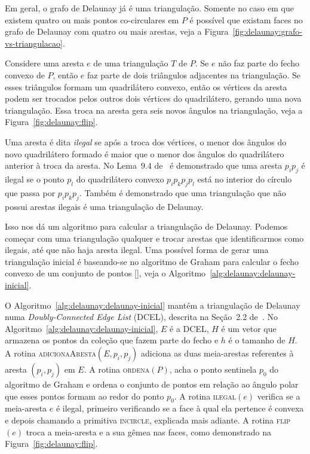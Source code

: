 

Em geral, o grafo de Delaunay já é uma triangulação.
Somente no caso em que existem quatro ou mais pontos co-circulares em $P$ é possível que existam
faces no grafo de Delaunay com quatro ou mais arestas, veja a
Figura~\ref{fig:delaunay:grafo-vs-triangulacao}.



Considere uma aresta $e$ de uma triangulação $T$ de $P$.
Se $e$ não faz parte do fecho convexo de $P$, então $e$ faz parte de dois triângulos adjacentes na
triangulação.
Se esses triângulos formam um quadrilátero convexo, então os vértices da aresta podem ser trocados
pelos outros dois vértices do quadrilátero, gerando uma nova triangulação.
Essa troca na aresta gera seis novos ângulos na triangulação, veja a
Figura~\ref{fig:delaunay:flip}.



Uma aresta é dita \textit{ilegal} se após a troca dos vértices, o menor dos ângulos do novo
quadrilátero formado é maior que o menor dos ângulos do quadrilátero anterior à troca da aresta.
No Lema~$9.4$ de~\cite{computationalgeometry} é demonstrado que uma aresta $p_{i}p_{j}$ é ilegal
se o ponto $p_{l}$ do quadrilátero convexo $p_{i}p_{k}p_{j}p_{l}$ está no interior do círculo que
passa por $p_{i}p_{k}p_{j}$.
Também é demonstrado que uma triangulação que não possui arestas ilegais é uma triangulação de
Delaunay.

Isso nos dá um algoritmo para calcular a triangulação de Delaunay.
Podemos começar com uma triangulação qualquer e trocar arestas que identificarmos como ilegais,
até que não haja aresta ilegal.
Uma possível forma de gerar uma triangulação inicial é baseando-se no algoritmo de Graham para
calcular o fecho convexo de um conjunto de pontos [\cite{Graham1972AnEA}], veja o
Algoritmo~\ref{alg:delaunay:delaunay-inicial}.

O Algoritmo~\ref{alg:delaunay:delaunay-inicial} mantém a triangulação de Delaunay numa
\textit{Doubly-Connected Edge List} (DCEL), descrita na Seção~2.2 de~\cite{computationalgeometry}.
No Algoritmo~\ref{alg:delaunay:delaunay-inicial}, $E$ é a DCEL, $H$ é um vetor que armazena os
pontos da coleção que fazem parte do fecho e $h$ é o tamanho de $H$.
A rotina \textsc{adicionaAresta}$(E, p_i, p_j)$ adiciona as duas meia-arestas referentes à aresta
$(p_i, p_j)$ em $E$.
A rotina \textsc{ordena}$(P)$, acha o ponto sentinela $p_0$ do algoritmo de Graham e ordena o
conjunto de pontos em relação ao ângulo polar que esses pontos formam ao redor do ponto $p_0$.
A rotina \textsc{ilegal}$(e)$ verifica se a meia-aresta $e$ é ilegal, primeiro verificando se a
face à qual ela pertence é convexa e depois chamando a primitiva \textsc{incircle}, explicada mais
adiante.
A rotina \textsc{flip}$(e)$ troca a meia-aresta e a sua gêmea nas faces, como demonstrado na
Figura~\ref{fig:delaunay:flip}.

